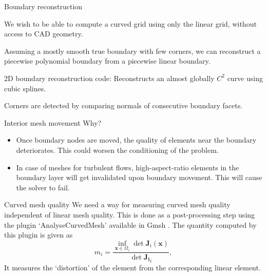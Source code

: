 \documentclass[t,12pt]{beamer}
\begin{document}
\begin{frame}{Boundary reconstruction}

We wish to be able to compute a curved grid using only the linear grid, without access to CAD geometry.

\vspace{1cm}
	
Assuming a mostly smooth true boundary with few corners, we can reconstruct a piecewise polynomial boundary from a piecewise linear boundary.
\vspace{1cm}

2D boundary reconstruction code: Reconstructs an almost globally $C^2$ curve using cubic splines.

Corners are detected by comparing normals of consecutive boundary facets.
\end{frame}

\begin{frame}{Interior mesh movement}
Why?
\begin{itemize}
	\item Once boundary nodes are moved, the quality of elements near the boundary deteriorates. This could worsen the conditioning of the problem.
	\item In case of meshes for turbulent flows, high-aspect-ratio elements in the boundary layer will get invalidated upon boundary movement. This will cause the solver to fail.
\end{itemize}
\end{frame}

\begin{frame}{Curved mesh quality}
We need a way for measuring curved mesh quality independent of linear mesh quality. This is done as a post-processing step using the plugin `AnalyseCurvedMesh' available in Gmsh . The quantity computed by this plugin is given as
\begin{equation} 
m_i = \frac{\inf_{\mathbf{x}\in\Omega_i}\det \mathbf{J}_i(\mathbf{x})}{\det \mathbf{J_l}_i},
\end{equation}
It measures the `distortion' of the element from the corresponding linear element.
\end{frame}
\end{document}
